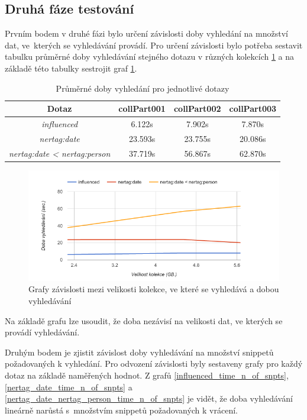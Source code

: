 \subsection{Druhá fáze testování}
Prvním bodem v druhé fázi bylo určení závislosti doby vyhledání na množství dat, ve~kterých se vyhledávání provádí. Pro určení závislosti bylo potřeba sestavit tabulku průměrné doby vyhledávání stejného dotazu v různých kolekcích \ref{avgTime} a na základě této tabulky sestrojit graf \ref{size_time}.

\begin{table}[H]
\centering
\begin{tabular}{|c|c|c|c|}
\hline
\textbf{Dotaz} & \textbf{collPart001} & \textbf{collPart002} & \textbf{collPart003}\\
\hline
\emph{influenced} & 6.122s &  7.902s & 7.870s \\
\hline
\emph{nertag:date} & 23.593s & 23.755s & 20.086s\\
\hline
\emph{nertag:date < nertag:person} & 37.719s & 56.867s & 62.870s \\
\hline
\end{tabular}
\caption{Průměrné doby vyhledání pro jednotlivé dotazy}
\label{avgTime}
\end{table}

\begin{figure}[H]
\includegraphics[scale=0.7]{obrazky-figures/size_time.png}
\caption{Grafy závislosti mezi velikosti kolekce, ve které se vyhledává a dobou vyhledávání}
\label{size_time}
\end{figure}

Na základě grafu lze usoudit, že doba nezávisí na velikosti dat, ve kterých se provádí vyhledávání.  

Druhým bodem je zjistit závislost doby vyhledávání na množství snippetů požadovaných k vyhledání. Pro odvození závislosti byly sestaveny  grafy pro každý dotaz na základě naměřených hodnot. Z grafů \ref{influenced_time_n_of_snpts},  \ref{nertag_date_time_n_of_snpts} a \ref{nertag_date_nertag_person_time_n_of_snpts} je vidět, že doba vyhledávání lineárně narůstá s~množstvím snippetů požadovaných k vrácení.



